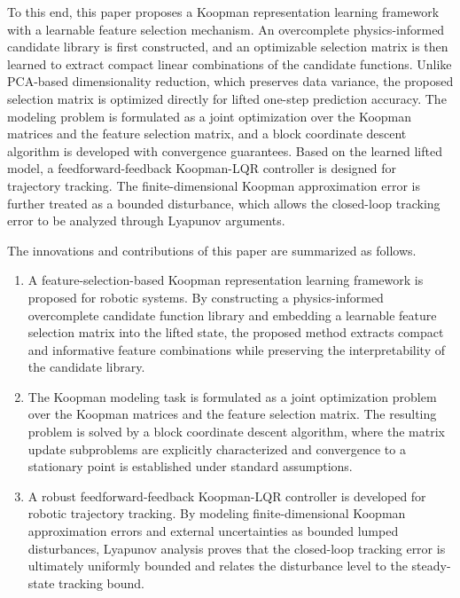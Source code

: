 \documentclass[final,3p,twocolumn,times]{elsarticle}
\begin{document}
To this end, this paper proposes a Koopman representation learning framework
with a learnable feature selection mechanism. An overcomplete
physics-informed candidate library is first constructed, and an optimizable
selection matrix is then learned to extract compact linear combinations of the
candidate functions. Unlike PCA-based dimensionality reduction, which preserves
data variance, the proposed selection matrix is optimized directly for lifted
one-step prediction accuracy. The modeling problem is formulated as a joint
optimization over the Koopman matrices and the feature selection matrix, and a
block coordinate descent algorithm is developed with convergence guarantees.
Based on the learned lifted model, a feedforward-feedback Koopman-LQR
controller is designed for trajectory tracking. The finite-dimensional Koopman
approximation error is further treated as a bounded disturbance, which allows
the closed-loop tracking error to be analyzed through Lyapunov arguments.

The innovations and contributions of this paper are summarized as follows.
{\renewcommand{\labelenumi}{(\arabic{enumi})}
\begin{enumerate}
\item A feature-selection-based Koopman representation learning framework is
proposed for robotic systems. By constructing a physics-informed overcomplete
candidate function library and embedding a learnable feature selection matrix
into the lifted state, the proposed method extracts compact and informative
feature combinations while preserving the interpretability of the candidate
library.

\item The Koopman modeling task is formulated as a joint optimization problem
over the Koopman matrices and the feature selection matrix. The resulting
problem is solved by a block coordinate descent algorithm, where the matrix
update subproblems are explicitly characterized and convergence to a
stationary point is established under standard assumptions.

\item A robust feedforward-feedback Koopman-LQR controller is developed for
robotic trajectory tracking. By modeling finite-dimensional Koopman
approximation errors and external uncertainties as bounded lumped
disturbances, Lyapunov analysis proves that the closed-loop tracking error is
ultimately uniformly bounded and relates the disturbance level to the
steady-state tracking bound.
\end{enumerate}}
\end{document}
